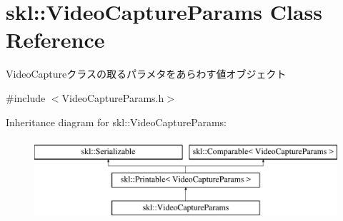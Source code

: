 \hypertarget{classskl_1_1_video_capture_params}{}\section{skl\+:\+:Video\+Capture\+Params Class Reference}
\label{classskl_1_1_video_capture_params}


Video\+Captureクラスの取るパラメタをあらわす値オブジェクト  




{\ttfamily \#include $<$Video\+Capture\+Params.\+h$>$}

Inheritance diagram for skl\+:\+:Video\+Capture\+Params\+:\begin{figure}[H]
\begin{center}
\leavevmode
\includegraphics[height=3.000000cm]{classskl_1_1_video_capture_params}
\end{center}
\end{figure}
